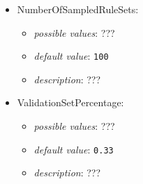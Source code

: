 \documentclass{article}
\begin{document}
\begin{itemize}
    \item NumberOfSampledRuleSets:
           \begin{itemize}
                \item \emph{possible values}: ???
                \item \emph{default value}: \texttt{100}
                \item \emph{description}: ???
           \end{itemize}
    \item ValidationSetPercentage:
           \begin{itemize}
                \item \emph{possible values}: ???
                \item \emph{default value}: \texttt{0.33}
                \item \emph{description}: ???
           \end{itemize}
\end{itemize}
\end{document}
